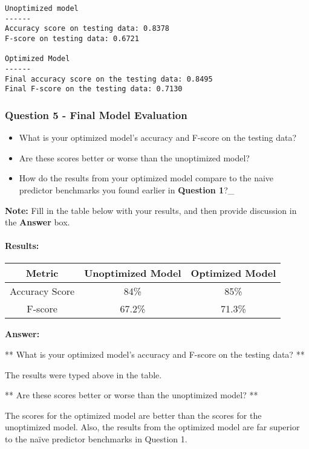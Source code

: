 \documentclass[11pt]{article}
\providecommand{\tightlist}{%
      \setlength{\itemsep}{0pt}\setlength{\parskip}{0pt}}
\begin{document}
    \begin{Verbatim}[commandchars=\\\{\}]
Unoptimized model
------
Accuracy score on testing data: 0.8378
F-score on testing data: 0.6721

Optimized Model
------
Final accuracy score on the testing data: 0.8495
Final F-score on the testing data: 0.7130

    \end{Verbatim}

    \hypertarget{question-5---final-model-evaluation}{%
\subsubsection{Question 5 - Final Model
Evaluation}\label{question-5---final-model-evaluation}}

\begin{itemize}
\tightlist
\item
  What is your optimized model's accuracy and F-score on the testing
  data?
\item
  Are these scores better or worse than the unoptimized model?
\item
  How do the results from your optimized model compare to the naive
  predictor benchmarks you found earlier in \textbf{Question 1}?\_
\end{itemize}

\textbf{Note:} Fill in the table below with your results, and then
provide discussion in the \textbf{Answer} box.

    \hypertarget{results}{%
\paragraph{Results:}\label{results}}

\begin{longtable}[]{@{}ccc@{}}
\toprule
Metric & Unoptimized Model & Optimized Model\tabularnewline
\midrule
\endhead
Accuracy Score & 84\% & 85\%\tabularnewline
F-score & 67.2\% & 71.3\%\tabularnewline
\bottomrule
\end{longtable}

    \textbf{Answer: }

** What is your optimized model's accuracy and F-score on the testing
data? **

The results were typed above in the table.

** Are these scores better or worse than the unoptimized model? **

The scores for the optimized model are better than the scores for the
unoptimized model. Also, the results from the optimized model are far
superior to the naïve predictor benchmarks in Question 1.
\end{document}
